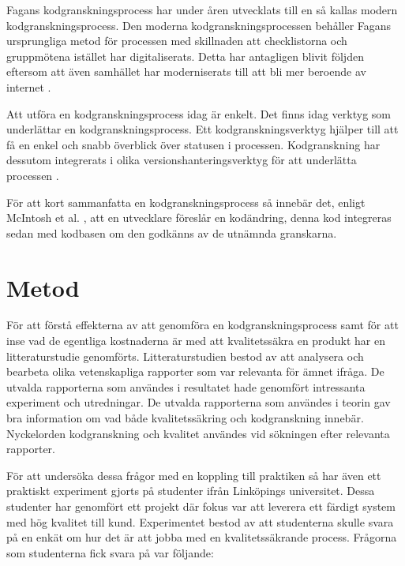 Fagans \cite{fagan1999design} kodgranskningsprocess har under åren utvecklats till en så kallas modern kodgranskningsprocess. Den moderna kodgranskningsprocessen behåller Fagans ursprungliga metod för processen med skillnaden att checklistorna och gruppmötena istället har digitaliserats. Detta har antagligen blivit följden eftersom att även samhället har moderniserats till att bli mer beroende av internet \cite{shimagaki2016study}.

Att utföra en kodgranskningsprocess idag är enkelt. Det finns idag verktyg som underlättar en kodgranskningsprocess. Ett kodgranskningsverktyg hjälper till att få en enkel och snabb överblick över statusen i processen. Kodgranskning har dessutom integrerats i olika versionshanteringsverktyg för att underlätta processen \cite{shimagaki2016study}. 

För att kort sammanfatta en kodgranskningsprocess så innebär det, enligt McIntosh et al. \cite{shimagaki2016study}, att en utvecklare föreslår en kodändring, denna kod integreras sedan med kodbasen om den godkänns av de utnämnda granskarna.


\section{Metod}
\label{sec:method-wallstrom}

För att förstå effekterna av att genomföra en kodgranskningsprocess samt för att inse vad de egentliga kostnaderna är med att kvalitetssäkra en produkt har en litteraturstudie genomförts. Litteraturstudien bestod av att analysera och bearbeta olika vetenskapliga rapporter som var relevanta för ämnet ifråga. De utvalda rapporterna som användes i resultatet hade genomfört intressanta experiment och utredningar. De utvalda rapporterna som användes i teorin gav bra information om vad både kvalitetssäkring och kodgranskning innebär. Nyckelorden kodgranskning och kvalitet användes vid sökningen efter relevanta rapporter.

För att undersöka dessa frågor med en koppling till praktiken så har även ett praktiskt experiment gjorts på studenter ifrån Linköpings universitet. Dessa studenter har genomfört ett projekt där fokus var att leverera ett färdigt system med hög kvalitet till kund. Experimentet bestod av att studenterna skulle svara på en enkät om hur det är att jobba med en kvalitetssäkrande process. Frågorna som studenterna fick svara på var följande:

